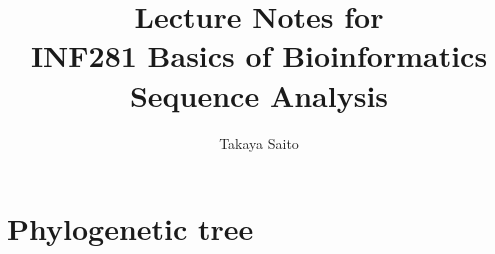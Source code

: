 \documentclass[12pt]{article}
\title{Lecture Notes for \\ INF281 Basics of Bioinformatics Sequence Analysis}
\author{Takaya Saito}
\date{}
\begin{document}
\setcounter{page}{63}

\makeatletter 
\renewcommand{\thefigure}{\arabic{section}.\arabic{figure}}
\renewcommand{\thetable}{\arabic{section}.\arabic{table}}
\makeatother

%
%
\setcounter{section}{8}
\setcounter{figure}{0}
\setcounter{table}{0}
\section{Phylogenetic tree}



%
\end{document}
